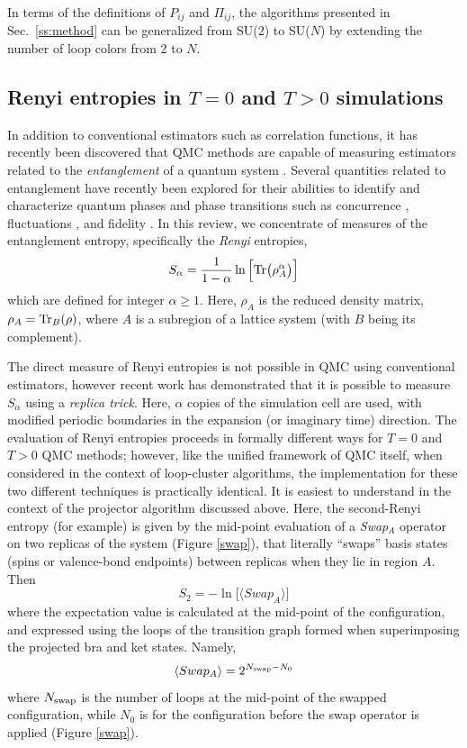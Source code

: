 \documentclass[range]{ar2e}
\begin{document}
In terms of the definitions of $P_{ij}$ and $\Pi_{ij}$, the algorithms presented in
Sec.~\ref{ss:method} can be generalized from SU(2) to SU($N$) by
extending the number of loop colors from 2 to $N$.


\subsection{Renyi entropies in $T=0$ and $T>0$ simulations} 
\label{ss:renyi}


In addition to conventional estimators such as correlation functions, it has recently been discovered that QMC methods are capable of measuring estimators related to the {\it entanglement} of a quantum system \cite{EntangleMeasure}.  Several quantities related to entanglement have recently been explored for their abilities to identify and characterize quantum phases and phase transitions such as concurrence \cite{conc1}, fluctuations \cite{fluc1,fluc2}, and fidelity \cite{fid1,fid2}.  In this review, we concentrate of measures of the entanglement entropy, specifically the {\it Renyi} entropies,
\begin{equation}
S_{\alpha} = \frac{1}{1-\alpha} \ln \Big[ {\rm Tr}\big( \rho_A^{\alpha} \big) \Big]
\end{equation}
which are defined for integer $\alpha \ge 1$.  Here, $\rho_A$ is the reduced density matrix, $\rho_A = {\rm Tr}_B (\rho)$, where $A$ is a subregion of a lattice system (with $B$ being its complement).  
 
The direct measure of Renyi entropies is not possible in QMC using conventional estimators, however recent work has demonstrated that it is possible to measure $S_{\alpha}$ using a {\it replica trick}.  Here, $\alpha$ copies of the simulation cell are used, with modified periodic boundaries in the expansion (or imaginary time) direction.  The evaluation of Renyi entropies proceeds in formally different ways for $T=0$ \cite{Hastings10} and $T>0$ \cite{Melko10} QMC methods; however, like the unified framework of QMC itself, when considered in the context of loop-cluster algorithms, the implementation for these two different techniques is practically identical.  It is easiest to understand in the context of the projector algorithm discussed above.  Here, the second-Renyi entropy (for example) is given by the mid-point evaluation of a {\it Swap}$_A$ operator on two replicas of the system (Figure \ref{swap}), that literally ``swaps'' basis states (spins or valence-bond endpoints) between replicas when they lie in region $A$.  Then
\begin{equation}
 S_2 = -\ln \Big[ \langle Swap_A \rangle \Big]
\end{equation}
 where the expectation value is calculated at the mid-point of the configuration, and expressed using the loops of the transition graph formed when superimposing the projected bra and ket states.  Namely,
\begin{equation}
\langle Swap_A \rangle = 2^{N_{\rm swap} - N_{0}} 
\end{equation} 
where $N_{\rm swap}$ is the number of loops at the mid-point of the swapped configuration, while $N_0$ is for the configuration before the swap operator is applied (Figure \ref{swap}).  
\end{document}
